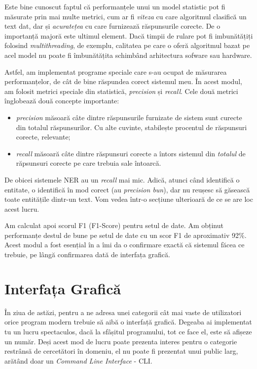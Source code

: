 Este bine cunoscut faptul că performanțele unui un model statistic pot fi măsurate prin mai multe metrici, cum ar fi \textit{viteza} cu care algoritmul clasifică un text dat, dar și \textit{acuratețea} cu care furnizează răspunsurile corecte. De o importanță majoră este ultimul element. Dacă timpii de rulare pot fi imbunătățiți folosind \textit{multithreading}, de exemplu, calitatea pe care o oferă algoritmul bazat pe acel model nu poate fi îmbunătățita schimbând arhitectura sofware sau hardware.

Astfel, am implementat programe speciale care s-au ocupat de măsurarea performanțelor, de cât de bine răspundea corect sistemul meu. În acest modul, am folosit metrici speciale din statistică, \textit{precision} și \textit{recall}. Cele două metrici înglobează două concepte importante:

\begin{itemize}
\item \textit{precision} măsoară câte dintre răspunsurile furnizate de sistem sunt curecte din totalul răspunsurilor. Cu alte cuvinte, stabilește procentul de răspunsuri corecte, relevante;

\item \textit{recall} măsoară câte dintre răspunsuri corecte a întors sistemul din \textit{totalul} de răpsunsuri corecte pe care trebuia sale întoarcă.
\end{itemize}

De obicei sistemele NER au un \textit{recall} mai mic. Adică, atunci când identifică o entitate, o identifică în mod corect (au \textit{precision bun}), dar nu reușesc să găsească toate entitățile dintr-un text. Vom vedea într-o secțiune ulterioară de ce se are loc acest lucru.

Am calculat apoi scorul F1 (F1-Score) pentru setul de date. Am obținut performanțe destul de bune pe setul de date cu un scor F1 de aproximativ 92\%. Acest modul a fost esențial în a îmi da o confirmare exactă că sistemul făcea ce trebuie, pe lângă confirmarea dată de interfața grafică.

\section{Interfața Grafică}

În ziua de astăzi, pentru a ne adresa unei categorii cât mai vaste de utilizatori orice program modern trebuie să aibă o interfață grafică. Degeaba ai implementat tu un lucru spectaculos, dacă la sfâșitul programului, tot ce face el, este să afișeze un număr. Deși acest mod de lucru poate prezenta interes pentru o categorie restrânsă de cercetători în domeniu, el nu poate fi prezentat unui public larg, arătând doar un \textit{Command Line Interface} - CLI.

